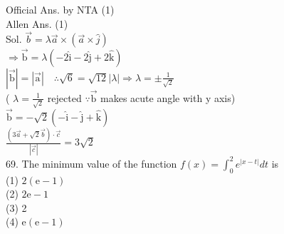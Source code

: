 \documentclass[10pt]{article}
\begin{document}
Official Ans. by NTA (1)\\
Allen Ans. (1)\\
Sol. \(\vec{b}=\lambda \vec{a} \times(\vec{a} \times \hat{j})\)\\
\(\Rightarrow \overrightarrow{\mathrm{b}}=\lambda(-2 \hat{\mathrm{i}}-2 \hat{\mathrm{j}}+2 \hat{\mathrm{k}})\)\\
\(|\overrightarrow{\mathrm{b}}|=|\overrightarrow{\mathrm{a}}| \quad \therefore \sqrt{6}=\sqrt{12}|\lambda| \Rightarrow \lambda= \pm \frac{1}{\sqrt{2}}\)\\
( \(\lambda=\frac{1}{\sqrt{2}}\) rejected \(\because \overrightarrow{\mathrm{b}}\) makes acute angle with y axis)\\
\(\overrightarrow{\mathrm{b}}=-\sqrt{2}(-\hat{\mathrm{i}}-\hat{\mathrm{j}}+\hat{\mathrm{k}})\)\\
\(\frac{(3 \vec{a}+\sqrt{2} \vec{b}) \cdot \vec{c}}{|\vec{c}|}=3 \sqrt{2}\)\\
69. The minimum value of the function \(f(x)=\int_{0}^{2} e^{|x-t|} d t\) is\\
(1) \(2(\mathrm{e}-1)\)\\
(2) \(2 \mathrm{e}-1\)\\
(3) 2\\
(4) \(\mathrm{e}(\mathrm{e}-1)\)
\end{document}
